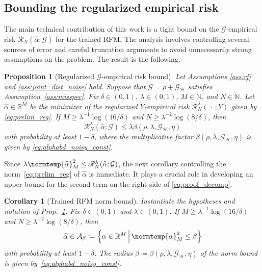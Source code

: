 \documentclass{article}
\theoremstyle{plain}
\newtheorem{proposition}[theorem]{Proposition}
\newtheorem{corollary}[theorem]{Corollary}
\theoremstyle{my_def}
\theoremstyle{my_rem}
\numberwithin{equation}{section}
\numberwithin{theorem}{section}%
\newcommand{\R}{\mathbb{R}}
\newcommand{\N}{\mathbb{N}}
\newcommand{\scrR}{\mathscr{R}}
\newcommand{\cA}{\mathcal{A}}
\newcommand{\cG}{\mathcal{G}}
\newcommand{\cH}{\mathcal{H}}
\let\originalleft\left %
\let\originalright\right
\renewcommand{\left}{\mathopen{}\mathclose\bgroup\originalleft}
\renewcommand{\right}{\aftergroup\egroup\originalright}
\newcommand{\norm}{\normtemp}
\renewcommand{\hat}{\widehat}
\newcommand{\set}[2]{{\left\{ #1 \,\middle|\, #2 \right\}}}
\newcommand{\slot}{{\,\cdot\,}}
\newcommand{\defeq}{\coloneqq} %
\newcommand{\al}{\alpha}
\newcommand{\GH}{\cG_{\cH}}
\newcommand{\alhat}{\hat{\al}}
\begin{document}
\subsection{Bounding the regularized empirical risk}\label{sec:proof_emp}
The main technical contribution of this work is a tight bound on the $\cG$-empirical risk $\scrR_N(\hat{\alpha};\cG)$ for the trained RFM. The analysis involves controlling several sources of error and careful truncation arguments to avoid unnecessarily strong assumptions on the problem. The result is the following.

\begin{proposition}[Regularized $\cG$-empirical risk bound]\label{prop:train_erm_bound_noisy}
Let Assumptions \ref{ass:rf} and \ref{ass:joint_dist_noise} hold. Suppose that $\cG = \rho+\GH $ satisfies Assumption~\ref{ass:misspec}. Fix $\delta\in(0,1)$, $\lambda\in(0,1)$, $M\in\N$, and $N\in\N$. Let $\alhat\in \R^M$ be the minimizer of the regularized $Y$-empirical risk $\scrR_N^\lambda(\slot;Y)$ given by \eqref{eq:prelim_reg}. If $M \ge \lambda^{-1}\log(16/\delta)$ and $N\geq \lambda^{-2}\log(8/\delta)$, then
\begin{equation}\label{eq:alphabd_noisy_risk}
    \scrR_N^\lambda(\hat{\alpha};\cG) \leq \lambda \beta(\rho,\lambda, \GH, \eta)
\end{equation}
with probability at least $1-\delta$, where the multiplicative factor $\beta(\rho,\lambda, \GH, \eta)$ is given by \eqref{eq:alphabd_noisy_const}.
\end{proposition}

Since $\lambda\norm{\alhat}_M^2\leq \scrR_N^{\lambda}(\alhat;\cG)$, the next corollary controlling the norm~\eqref{eq:prelim_reg} of $\alhat$ is immediate. It plays a crucial role in developing an upper bound for the second term on the right side of \eqref{eq:proof_decomp}.
\begin{corollary}[Trained RFM norm bound]\label{cor:train_norm_bound_noisy}
    Instantiate the hypotheses  and notation of Prop.~\ref{prop:train_erm_bound_noisy}. Fix $\delta\in(0,1)$ and $\lambda\in(0,1)$. If $M \ge \lambda^{-1}\log(16/\delta)$ and $N\geq \lambda^{-2}\log(8/\delta)$, then
    \begin{equation}\label{eq:alphabd_noisy}
        \alhat \in \cA_{\beta}\defeq \set{\al\in\R^M}{\norm{\al}_M^2\leq \beta}
    \end{equation}
    with probability at least $1-\delta$. The radius $\beta\defeq \beta(\rho,\lambda,\GH,\eta)$ of the norm bound is given by~\eqref{eq:alphabd_noisy_const}.
\end{corollary}
\end{document}
